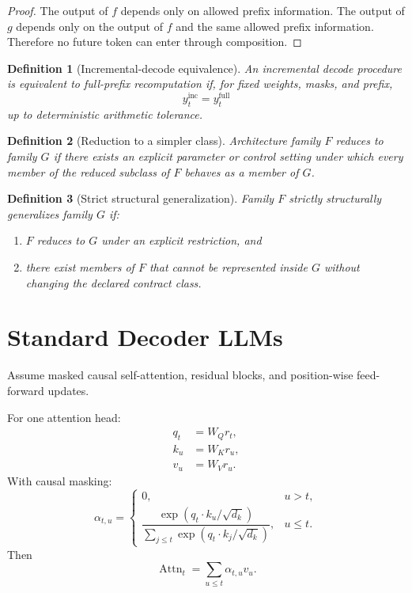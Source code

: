\documentclass[11pt]{article}
\newtheorem{definition}{Definition}[section]
\newcommand{\Attn}{\operatorname{Attn}}
\begin{document}
\begin{proof}
The output of $f$ depends only on allowed prefix information. The output of
$g$ depends only on the output of $f$ and the same allowed prefix information.
Therefore no future token can enter through composition.
\end{proof}

\begin{definition}[Incremental-decode equivalence]
An incremental decode procedure is equivalent to full-prefix recomputation if,
for fixed weights, masks, and prefix,
\[
  y_t^{\mathrm{inc}} = y_t^{\mathrm{full}}
\]
up to deterministic arithmetic tolerance.
\end{definition}

\begin{definition}[Reduction to a simpler class]
Architecture family $F$ reduces to family $G$ if there exists an explicit
parameter or control setting under which every member of the reduced subclass
of $F$ behaves as a member of $G$.
\end{definition}

\begin{definition}[Strict structural generalization]
Family $F$ strictly structurally generalizes family $G$ if:
\begin{enumerate}
  \item $F$ reduces to $G$ under an explicit restriction, and
  \item there exist members of $F$ that cannot be represented inside $G$
    without changing the declared contract class.
\end{enumerate}
\end{definition}

\section{Standard Decoder LLMs}

Assume masked causal self-attention, residual blocks, and position-wise
feed-forward updates.

For one attention head:
\begin{align}
  q_t &= W_Q r_t, \\
  k_u &= W_K r_u, \\
  v_u &= W_V r_u.
\end{align}
With causal masking:
\[
  \alpha_{t,u} =
  \begin{cases}
    0, & u > t, \\
    \dfrac{\exp(q_t \cdot k_u / \sqrt{d_k})}
      {\sum_{j \le t}\exp(q_t \cdot k_j / \sqrt{d_k})}, & u \le t.
  \end{cases}
\]
Then
\[
  \Attn_t = \sum_{u \le t} \alpha_{t,u} v_u.
\]
\end{document}
